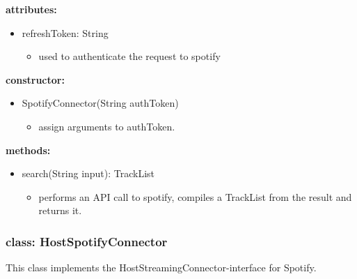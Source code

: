 \documentclass[oneside, ngerman]{sdqtechreport}
\begin{document}
\textbf{attributes:}
\begin{itemize}
    \item refreshToken: String
    \begin{itemize}
        \item used to authenticate the request to spotify
    \end{itemize}
\end{itemize}
\textbf{constructor:}
\begin{itemize}
    \item SpotifyConnector(String authToken)
    \begin{itemize}
        \item assign arguments to authToken.
    \end{itemize}
\end{itemize}
\textbf{methods:}
\begin{itemize}
    \item search(String input): TrackList
    \begin{itemize}
        \item  performs an API call to spotify, compiles a TrackList from the result and returns it. 
    \end{itemize}
\end{itemize}


\subsubsection{class: HostSpotifyConnector}
This class implements the HostStreamingConnector-interface for Spotify.
\end{document}
